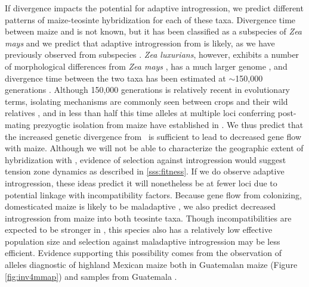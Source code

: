 If divergence impacts the potential for adaptive introgression, we predict different patterns of maize-teosinte hybridization for each of these taxa. 
Divergence time between maize and \zh{} is not known, but it has been classified as a subspecies of \emph{Zea mays} \citep{doebley1990systematics} and we predict that adaptive introgression from \zh{} is likely, as we have previously observed from subspecies \zm{} \citep{Hufford2013}.
\emph{Zea luxurians}, however, exhibits a number of morphological differences from \emph{Zea mays} \citep{doebley1980taxonomy}, has a much larger genome \citep{tenaillon2011genome}, and divergence time between the two taxa has been estimated at $\sim$150,000 generations \citep{Ross-Ibarra2009a}. 
Although 150,000 generations is relatively recent in evolutionary terms, isolating mechanisms are commonly seen between crops and their wild relatives \citep{dempewolf2012reproductive}, and in less than half this time alleles at multiple loci conferring post-mating prezyogtic isolation from maize have established in \zm{} \citep{evans2001teosinte,kermicle2010zea,kermicle2006gametophyte}.
We thus predict that the increased genetic divergence from \zl\ is sufficient to lead to decreased gene flow with maize. 
Although we will not be able to characterize the geographic extent of hybridization with \zl, evidence of selection against introgression would suggest tension zone dynamics as described in \ref{sss:fitness}.
If we do observe adaptive introgression, these ideas predict it will nonetheless be at fewer loci due to potential linkage with incompatibility factors. 
Because gene flow from colonizing, domesticated maize is likely to be maladaptive \citep{Hufford2013}, we also predict decreased introgression from maize into both teosinte taxa. 
Though incompatibilities are expected to be stronger in \zl{}, this species also has a relatively low effective population size \citep{Ross-Ibarra2009a} and selection against maladaptive introgression may be less efficient.
Evidence supporting this possibility comes from the observation of alleles diagnostic of highland Mexican maize both in Guatemalan maize (Figure \ref{fig:inv4mmap}) and \zl{} samples from Guatemala \citep{Fang2012}.

